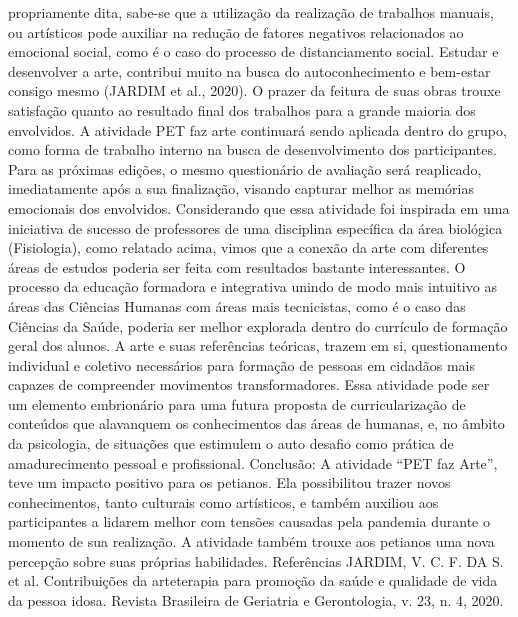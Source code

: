 propriamente dita, sabe-se que a utilização da realização de trabalhos manuais, ou artísticos pode 
auxiliar na redução de fatores negativos relacionados ao emocional social, como é o caso do 
processo de distanciamento social. Estudar e desenvolver a arte, contribui muito na busca do
autoconhecimento e bem-estar consigo mesmo (JARDIM et al., 2020). O prazer da feitura de suas 
obras trouxe satisfação quanto ao resultado final dos trabalhos para a grande maioria dos 
envolvidos. A atividade PET faz arte continuará sendo aplicada dentro do grupo, como forma de 
trabalho interno na busca de desenvolvimento dos participantes. Para as próximas edições, o 
mesmo questionário de avaliação será reaplicado, imediatamente após a sua finalização, visando 
capturar melhor as memórias emocionais dos envolvidos. Considerando que essa atividade foi 
inspirada em uma iniciativa de sucesso de professores de uma disciplina específica da área 
biológica (Fisiologia), como relatado acima, vimos que a conexão da arte com diferentes áreas de 
estudos poderia ser feita com resultados bastante interessantes. O processo da educação formadora 
e integrativa unindo de modo mais intuitivo as áreas das Ciências Humanas com áreas mais 
tecnicistas, como é o caso das Ciências da Saúde, poderia ser melhor explorada dentro do currículo 
de formação geral dos alunos. A arte e suas referências teóricas, trazem em si, questionamento 
individual e coletivo necessários para formação de pessoas em cidadãos mais capazes de 
compreender movimentos transformadores. Essa atividade pode ser um elemento embrionário para 
uma futura proposta de curricularização de conteúdos que alavanquem os conhecimentos das áreas 
de humanas, e, no âmbito da psicologia, de situações que estimulem o auto desafio como prática 
de amadurecimento pessoal e profissional. Conclusão: A atividade “PET faz Arte”, teve um 
impacto positivo para os petianos. Ela possibilitou trazer novos conhecimentos, tanto culturais 
como artísticos, e também auxiliou aos participantes a lidarem melhor com tensões causadas pela 
pandemia durante o momento de sua realização. A atividade também trouxe aos petianos uma nova 
percepção sobre suas próprias habilidades. 
Referências 
JARDIM, V. C. F. DA S. et al. Contribuições da arteterapia para promoção da saúde e qualidade 
de vida da pessoa idosa. Revista Brasileira de Geriatria e Gerontologia, v. 23, n. 4, 2020.




